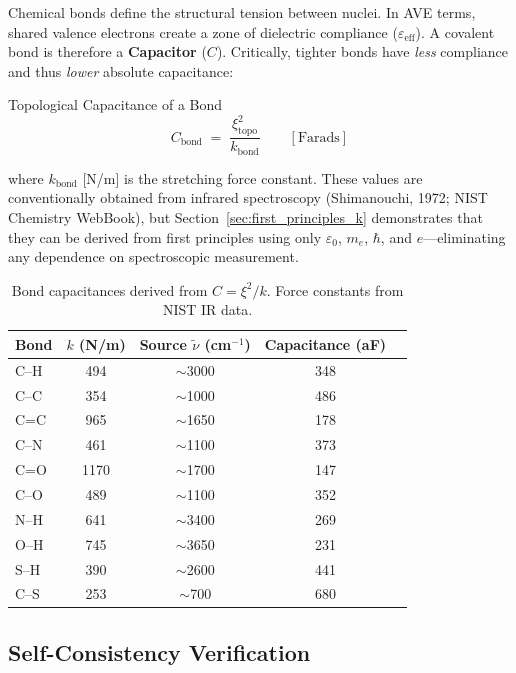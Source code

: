 Chemical bonds define the structural tension between nuclei. In AVE terms, shared valence electrons create a zone of dielectric compliance ($\varepsilon_\text{eff}$). A covalent bond is therefore a \textbf{Capacitor} ($C$). Critically, tighter bonds have \emph{less} compliance and thus \emph{lower} absolute capacitance:
\begin{resultbox}{Topological Capacitance of a Bond}
\begin{equation}
    C_\text{bond} \;=\; \frac{\xi^2_\text{topo}}{k_\text{bond}}
    \qquad [\text{Farads}]
    \label{eq:C_bond}
\end{equation}
\end{resultbox}
where $k_\text{bond}$ [N/m] is the stretching force constant. These values are conventionally obtained from infrared spectroscopy (Shimanouchi, 1972; NIST Chemistry WebBook), but Section~\ref{sec:first_principles_k} demonstrates that they can be derived from first principles using only $\varepsilon_0$, $m_e$, $\hbar$, and $e$---eliminating any dependence on spectroscopic measurement.

\begin{table}[h]
\centering
\begin{tabular}{lcccc}
\hline
\textbf{Bond} & $k$ \textbf{(N/m)} & \textbf{Source $\tilde{\nu}$ (cm$^{-1}$)} & \textbf{Capacitance (aF)} \\
\hline
C--H  & 494  & $\sim$3000 & 348 \\
C--C  & 354  & $\sim$1000 & 486 \\
C=C   & 965  & $\sim$1650 & 178 \\
C--N  & 461  & $\sim$1100 & 373 \\
C=O   & 1170 & $\sim$1700 & 147 \\
C--O  & 489  & $\sim$1100 & 352 \\
N--H  & 641  & $\sim$3400 & 269 \\
O--H  & 745  & $\sim$3650 & 231 \\
S--H  & 390  & $\sim$2600 & 441 \\
C--S  & 253  & $\sim$700  & 680 \\
\hline
\end{tabular}
\caption{Bond capacitances derived from $C = \xi^2 / k$. Force constants from NIST IR data.}
\label{tab:capacitances}
\end{table}

\subsection{Self-Consistency Verification}

